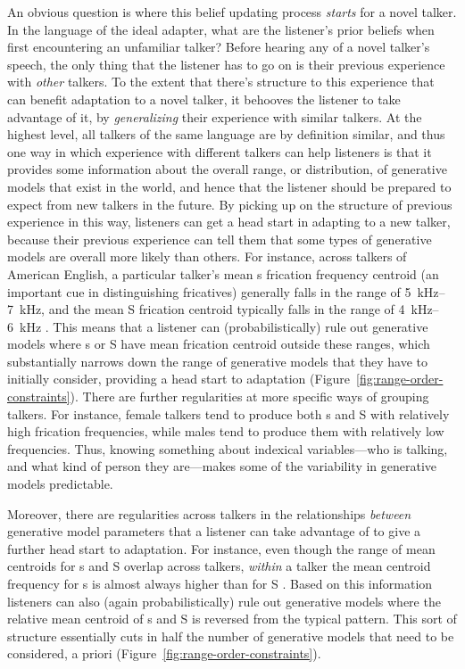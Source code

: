An obvious question is where this belief updating process \emph{starts} for a novel talker. In the language of the ideal adapter, what are the listener's prior beliefs when first encountering an unfamiliar talker?  Before hearing any of a novel talker's speech, the only thing that the listener has to go on is their previous experience with \emph{other} talkers.  To the extent that there's structure to this experience that can benefit adaptation to a novel talker, it behooves the listener to take advantage of it, by \emph{generalizing} their experience with similar talkers.  At the highest level, all talkers of the same language are by definition similar, and thus one way in which experience with different talkers can help listeners is that it provides some information about the overall range, or distribution, of generative models that exist in the world, and hence that the listener should be prepared to expect from new talkers in the future.  By picking up on the structure of previous experience in this way, listeners can get a head start in adapting to a new talker, because their previous experience can tell them that some types of generative models are overall more likely than others.  For instance, across talkers of American English, a particular talker's mean \ph s frication frequency centroid (an important cue in distinguishing fricatives) generally falls in the range of \SIrange{5}{7}{\kilo\hertz}, and the mean \ph S frication centroid typically falls in the range of \SIrange{4}{6}{\kilo\hertz} \cite{Newman2001}.  This means that a listener can (probabilistically) rule out generative models where \ph s or \ph S have mean frication centroid outside these ranges, which substantially narrows down the range of generative models that they have to initially consider, providing a head start to adaptation (Figure~\ref{fig:range-order-constraints}).  There are further regularities at more specific ways of grouping talkers.  For instance, female talkers tend to produce both \ph s and \ph S with relatively high frication frequencies, while males tend to produce them with relatively low frequencies.  Thus, knowing something about indexical variables---who is talking, and what kind of person they are---makes some of the variability in generative models predictable.

Moreover, there are regularities across talkers in the relationships \emph{between} generative model parameters that a listener can take advantage of to give a further head start to adaptation.  For instance, even though the range of mean centroids for \ph s and \ph S overlap across talkers, \emph{within} a talker the mean centroid frequency for \ph s is almost always higher than for \ph S \cite{Newman2001}.  Based on this information listeners can also (again probabilistically) rule out generative models where the relative mean centroid of \ph s and \ph S is reversed from the typical pattern.  This sort of structure essentially cuts in half the number of generative models that need to be considered, a priori (Figure~\ref{fig:range-order-constraints}).  


